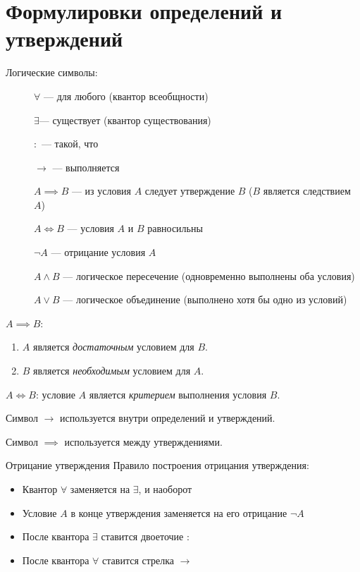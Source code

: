 \section{Формулировки определений и утверждений}

Логические символы:
\begin{description}
    \item[] $\forall$ --- для любого (квантор всеобщности)
    \item[] $\exists$--- существует (квантор существования)
    \item[] $\colon$ --- такой, что
    \item[] $\to$ --- выполняется
    \item[] $A \implies B$ --- из условия $A$ следует утверждение $B$ ($B$ является следствием $A$)
    \item[] $A \iff B$ --- условия $A$ и $B$ равносильны
    \item[] $\neg A$ --- отрицание условия $A$
    \item[] $A \land B$ --- логическое пересечение (одновременно выполнены оба условия)
    \item[] $A \lor B$ --- логическое объединение (выполнено хотя бы одно из условий)
\end{description}

$A \implies B$:
\begin{enumerate}
    \item $A$ является \textit{достаточным} условием для $B$.
    \item $B$ является \textit{необходимым} условием для $A$.
\end{enumerate}

$A \iff B$: условие $A$ является \textit{критерием} выполнения условия $B$.

Символ $\to$ используется внутри определений и утверждений.

Символ $\implies$ используется между утверждениями.

\begin{definition}{Отрицание утверждения}{}
    Правило построения отрицания утверждения:
    \begin{itemize}
        \item Квантор $\forall$ заменяется на $\exists$, и наоборот
        \item Условие $A$ в конце утверждения заменяется на его отрицание $\neg A$
        \item После квантора $\exists$ ставится двоеточие $\colon$
        \item После квантора $\forall$ ставится стрелка $\to$
    \end{itemize}
\end{definition}

